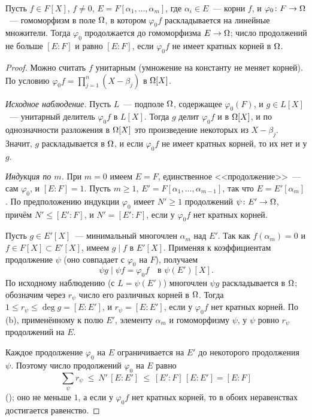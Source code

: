 \begin{proposition}[2.12a]
Пусть $f\in F[X]$, $f\ne0$, $E=F[\alpha_1,\dots,\alpha_m]$, где $\alpha_i\in E$~--- корни $f$, и $\varphi_0\colon F\to\Omega$~--- гомоморфизм в
поле $\Omega$, в котором $\varphi_0f$ раскладывается на линейные множители. Тогда $\varphi_0$ продолжается до гомоморфизма
$E\to\Omega$; число продолжений не больше $[E:F]$ и равно $[E:F]$, если $\varphi_0f$ не имеет кратных корней в $\Omega$.
\end{proposition}

\begin{proof}
Можно считать $f$ унитарным (умножение на константу не меняет корней). По условию
$\varphi_0f=\prod_{j=1}^n(X-\beta_j)$ в $\Omega[X]$.

\emph{Исходное наблюдение.} Пусть $L$~--- подполе $\Omega$, содержащее $\varphi_0(F)$, и $g\in L[X]$~--- унитарный делитель
$\varphi_0f$ в $L[X]$. Тогда $g$ делит $\varphi_0f$ и в $\Omega[X]$, и по однозначности разложения в $\Omega[X]$ это произведение
некоторых из $X-\beta_j$. Значит, $g$ раскладывается в $\Omega$, и если $\varphi_0f$ не имеет кратных корней, то их нет и у $g$.

\emph{Индукция по $m$.} При $m=0$ имеем $E=F$, единственное <<продолжение>>~--- сам $\varphi_0$, и $[E:F]=1$. Пусть $m\ge1$,
$E'=F[\alpha_1,\dots,\alpha_{m-1}]$, так что $E=E'[\alpha_m]$. По предположению индукции $\varphi_0$ имеет $N'\ge1$
продолжений $\psi\colon E'\to\Omega$, причём $N'\le[E':F]$, и $N'=[E':F]$, если у $\varphi_0f$ нет кратных корней.

Пусть $g\in E'[X]$~--- минимальный многочлен $\alpha_m$ над $E'$. Так как $f(\alpha_m)=0$ и $f\in F[X]\subset E'[X]$, имеем
$g\mid f$ в $E'[X]$. Применяя к коэффициентам продолжение $\psi$ (оно совпадает с $\varphi_0$ на $F$), получаем
\[
\psi g\mid\psi f=\varphi_0f\quad\text{в }\psi(E')[X].
\]
По исходному наблюдению (с $L=\psi(E')$) многочлен $\psi g$ раскладывается в $\Omega$; обозначим через $r_\psi$ число его
различных корней в $\Omega$. Тогда $1\le r_\psi\le\deg g=[E:E']$, и $r_\psi=[E:E']$, если у $\varphi_0f$ нет кратных корней. По
(b), применённому к полю $E'$, элементу $\alpha_m$ и гомоморфизму $\psi$, у $\psi$ ровно $r_\psi$ продолжений на $E$.

Каждое продолжение $\varphi_0$ на $E$ ограничивается на $E'$ до некоторого продолжения $\psi$. Поэтому число продолжений
$\varphi_0$ на $E$ равно
\[
\sum_{\psi}r_\psi\ \le\ N'\,[E:E']\ \le\ [E':F]\,[E:E']=[E:F]
\]
(); оно не меньше $1$, а если у $\varphi_0f$ нет кратных корней, то в обоих неравенствах достигается равенство.
\end{proof}

